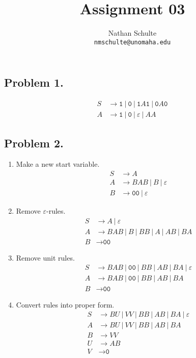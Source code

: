 \documentclass{article}
\begin{document}
\title{Assignment 03}
\date{}
\author{Nathan Schulte \\ \texttt{nmschulte@unomaha.edu}}
\maketitle

\subsection*{Problem 1.}

\begin{align*}
  S &\rightarrow \texttt{1}\:|\:\texttt{0}\:|\:\texttt{1}A\texttt{1}\:|\:\texttt{0}A\texttt{0}\\
  A &\rightarrow \texttt{1}\:|\:\texttt{0}\:|\:\varepsilon\:|\:AA
\end{align*}


\subsection*{Problem 2.}

\begin{enumerate}
  \item Make a new start variable.\\
    \begin{align*}
      S &\rightarrow A\\
      A &\rightarrow BAB\:|\:B\:|\:\varepsilon\\
      B &\rightarrow \texttt{00}\:|\:\varepsilon
    \end{align*}
  \item Remove \(\varepsilon\)-rules.\\
    \begin{align*}
      S &\rightarrow A\:|\:\varepsilon\\
      A &\rightarrow BAB\:|\:B\:|\:BB\:|\:A\:|\:AB\:|\:BA\\
      B &\rightarrow \texttt{00}
    \end{align*}
  \item Remove unit rules.\\
    \begin{align*}
      S &\rightarrow BAB\:|\:\texttt{00}\:|\:BB\:|\:AB\:|\:BA\:|\:\varepsilon\\
      A &\rightarrow BAB\:|\:\texttt{00}\:|\:BB\:|\:AB\:|\:BA\\
      B &\rightarrow \texttt{00}
    \end{align*}
  \item Convert rules into proper form.\\
    \begin{align*}
      S &\rightarrow BU\:|\:VV\:|\:BB\:|\:AB\:|\:BA\:|\:\varepsilon\\
      A &\rightarrow BU\:|\:VV\:|\:BB\:|\:AB\:|\:BA\\
      B &\rightarrow VV\\
      U &\rightarrow AB\\
      V &\rightarrow \texttt{0}
    \end{align*}
\end{enumerate}
\end{document}

